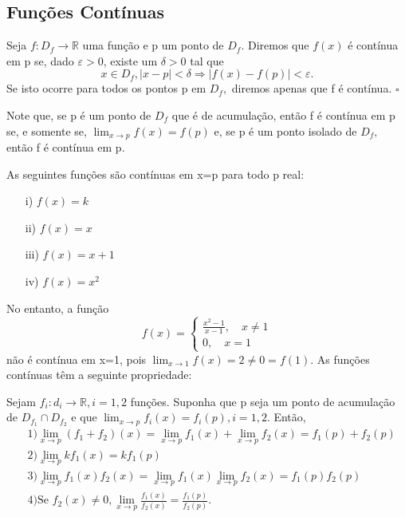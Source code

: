 \documentclass[Analysis/analysis_notes.tex]{subfiles}
\begin{document}
\subsection{Fun\c c\~oes Cont\'inuas}
\begin{def*}
	Seja $f:D_{f}\rightarrow \mathbb{R}$ uma fun\c c\~ao e p um ponto de $D_{f}.$ Diremos que $f(x)$ \'e cont\'inua em p
	se, dado $\varepsilon > 0$, existe um $\delta > 0$ tal que
	$$
		x\in D_{f}, |x-p|<\delta \Rightarrow |f(x)-f(p)|<\varepsilon.
	$$
	Se isto ocorre para todos os pontos p em $D_{f},$ diremos apenas que f \'e cont\'inua. $\square$
\end{def*}
Note que, se p \'e um ponto de $D_{f}$ que \'e de acumula\c c\~ao, ent\~ao f \'e cont\'inua em p se, e somente se,
$\lim_{x\to p}f(x)=f(p)$ e, se p \'e um ponto isolado de $D_{f},$ ent\~ao f \'e cont\'inua em p.
\begin{example}
	As seguintes fun\c c\~oes s\~ao cont\'inuas em x=p para todo p real:
	\begin{itemize}
		\item[i)]$f(x) = k$
		\item[ii)]$f(x) = x$
		\item[iii)]$f(x) = x + 1$
		\item[iv)]$f(x) = x^{2}$
	\end{itemize}
\end{example}
No entanto, a fun\c c\~ao
$$
	f(x) = \left\{\begin{array}{ll}
		\frac{x^{2}-1}{x-1},\quad x\neq 1 \\
		0,\quad x=1
	\end{array}\right.
$$
n\~ao \'e cont\'inua em x=1, pois $\lim_{x\to 1}f(x) = 2\neq 0 = f(1).$
As fun\c c\~oes cont\'inuas t\^em a seguinte propriedade:
\begin{theorem*}
	Sejam $f_{i}:d_{i}\rightarrow \mathbb{R},i=1,2$ fun\c c\~oes. Suponha que p seja um ponto de acumula\c c\~ao de
	$D_{f_{1}}\cap{D_{f_{2}}}$ e que $\lim_{x\to p}f_{i}(x) = f_{i}(p), i=1, 2.$ Ent\~ao,
	\begin{align*}
		 & 1) \lim_{x\to p}(f_{1}+f_{2})(x) = \lim_{x\to p}f_{1}(x) + \lim_{x\to p}f_{2}(x) = f_{1}(p)+f_{2}(p) \\
		 & 2) \lim_{x\to p}kf_{1}(x) = kf_{1}(p)                                                                \\
		 & 3) \lim_{x\to p}f_{1}(x)f_{2}(x) = \lim_{x\to p}f_{1}(x)\lim_{x\to p}f_{2}(x) = f_{1}(p)f_{2}(p)     \\
		 & 4) \text{Se } f_{2}(x)\neq0, \lim_{x\to p}\frac{f_{1}(x)}{f_{2}(x)} = \frac{f_{1}(p)}{f_{2}(p)}.
	\end{align*}
\end{theorem*}
\end{document}
